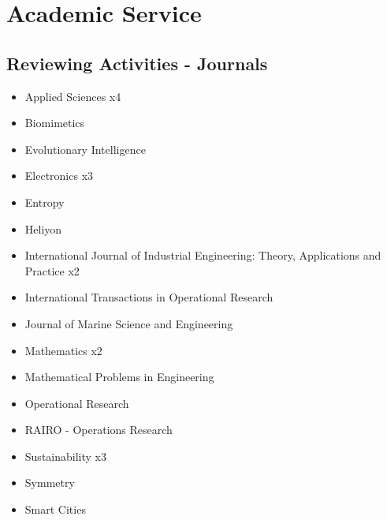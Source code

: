 \section{Academic Service}

\subsection{Reviewing Activities - Journals}

{\begin{itemize}
\item Applied Sciences x4
\item Biomimetics
\item Evolutionary Intelligence
\item Electronics x3
\item Entropy
\item Heliyon
\item International Journal of Industrial Engineering: Theory, Applications and Practice x2
\item International Transactions in Operational Research
\item Journal of Marine Science and Engineering
\item Mathematics x2
\item Mathematical Problems in Engineering
\item Operational Research
\item RAIRO - Operations Research
\item Sustainability x3
\item Symmetry
\item Smart Cities
\end{itemize}
}


